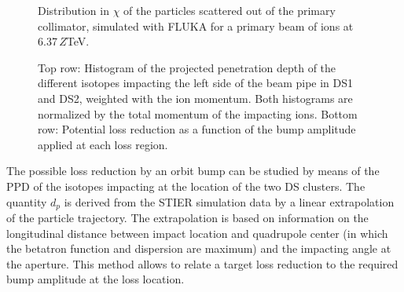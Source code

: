 \begin{figure}[htbp]
  \centering
  \caption{Distribution in $\chi$ of the particles scattered out of the primary collimator, simulated with FLUKA for a primary beam of  \lead ions at 6.37$\,Z$TeV.}  
  \label{pic:16061608}
  \end{figure}

\begin{figure}[htbp]
  \centering
  \caption{Top row: Histogram of the projected penetration depth of the different isotopes impacting the left side of the beam pipe in DS1 and DS2, weighted with the ion momentum. Both histograms are normalized by the total momentum of the impacting ions. Bottom row: Potential loss reduction as a function of the bump amplitude applied at each loss region. }  
  \label{pic:16061701}
  \end{figure}



The possible loss reduction by an orbit bump can be studied by means of the PPD of the isotopes impacting at the location of the two DS clusters. The quantity $d_p$ is derived from the STIER simulation data by a linear extrapolation of the particle trajectory. The extrapolation is based on information on the longitudinal distance between impact location and quadrupole center (in which the betatron function and dispersion are maximum) and the impacting angle at the aperture. This method allows to relate a target loss reduction to the required bump amplitude at the loss location. 

